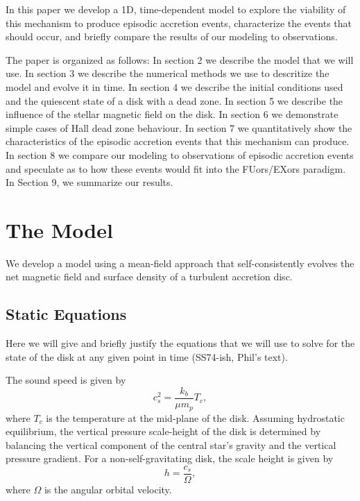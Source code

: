 In this paper we develop a 1D, time-dependent model to explore the viability of this mechanism to produce episodic accretion events, characterize the events that should occur, and briefly compare the results of our modeling to observations.  

The paper is organized as follows: In section 2 we describe the model that we will use.  In section 3 we describe the numerical methods we use to descritize the model and evolve it in time.  In section 4 we describe the initial conditions used and the quiescent state of a disk with a dead zone.  In section 5 we describe the influence of the stellar magnetic field on the disk.  In section 6 we demonstrate simple cases of Hall dead zone behaviour. In section 7 we quantitatively show the characteristics of the episodic accretion events that this mechanism can produce.  In section 8 we compare our modeling to observations of episodic accretion events and speculate as to how these events would fit into the FUors/EXors paradigm.  In Section 9, we summarize our results.  





\section{The Model}
\label{1dmodel}
We develop a model using a mean-field approach that self-consistently evolves the net magnetic field and surface density of a turbulent accretion disc.     


\subsection{Static Equations} 
Here we will give and briefly justify the equations that we will use to solve for the state of the disk at any given point in time (SS74-ish, Phil's text).

The sound speed is given by
\begin{equation} 
c_s^2        = \frac{k_b}{\mu m_p}T_c ,              
\end{equation}
where $T_c$ is the temperature at the mid-plane of the disk.  Assuming hydrostatic equilibrium, the vertical pressure scale-height of the disk is determined by balancing the vertical component of the central star's gravity and the vertical pressure gradient.  For a non-self-gravitating disk, the scale height is given by     
\begin{equation} 
h            = \frac{c_s}{\Omega},  
\end{equation}
where $\Omega$ is the angular orbital velocity.

